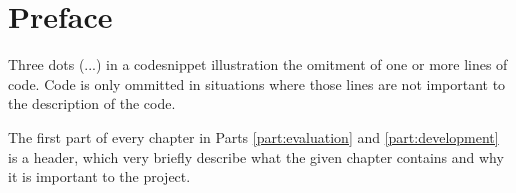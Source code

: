 \chapter*{Preface}
\label{chap:preface}

Three dots (...) in a codesnippet illustration the omitment of one or more lines of code. 
Code is only ommitted in situations where those lines are not important to the description of the code. 

The first part of every chapter in Parts \ref{part:evaluation} and \ref{part:development} is a header, which very briefly describe what the given chapter contains and why it is important to the project.


